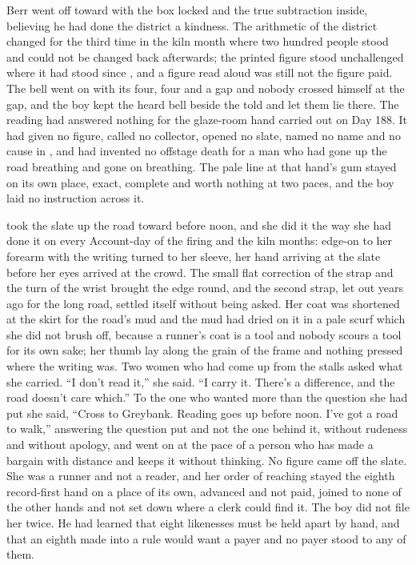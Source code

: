 Berr went off toward  with the box locked and the true subtraction inside, believing he had done the district a kindness. The arithmetic of the district changed for the third time in the kiln month where two hundred people stood and could not be changed back afterwards; the printed figure stood unchallenged where it had stood since , and a figure read aloud was still not the figure paid. The bell went on with its four, four and a gap and nobody crossed himself at the gap, and the boy kept the heard bell beside the told and let them lie there. The reading had answered nothing for the glaze-room hand carried out on Day 188. It had given no figure, called no collector, opened no slate, named no name and no cause in , and had invented no offstage death for a man who had gone up the road breathing and gone on breathing. The pale line at that hand's gum stayed on its own place, exact, complete and worth nothing at two paces, and the boy laid no instruction across it.

\scenebreak

 took the slate up the road toward  before noon, and she did it the way she had done it on every Account-day of the firing and the kiln months: edge-on to her forearm with the writing turned to her sleeve, her hand arriving at the slate before her eyes arrived at the crowd. The small flat correction of the strap and the turn of the wrist brought the edge round, and the second strap, let out years ago for the long road, settled itself without being asked. Her coat was shortened at the skirt for the road's mud and the mud had dried on it in a pale scurf which she did not brush off, because a runner's coat is a tool and nobody scours a tool for its own sake; her thumb lay along the grain of the frame and nothing pressed where the writing was. Two women who had come up from the stalls asked what she carried. “I don't read it,” she said. “I carry it. There's a difference, and the road doesn't care which.” To the one who wanted more than the question she had put she said, “Cross to Greybank. Reading goes up before noon. I've got a road to walk,” answering the question put and not the one behind it, without rudeness and without apology, and went on at the pace of a person who has made a bargain with distance and keeps it without thinking. No figure came off the slate. She was a runner and not a reader, and her order of reaching stayed the eighth record-first hand on a place of its own, advanced and not paid, joined to none of the other hands and not set down where a clerk could find it. The boy did not file her twice. He had learned that eight likenesses must be held apart by hand, and that an eighth made into a rule would want a payer and no payer stood to any of them.

